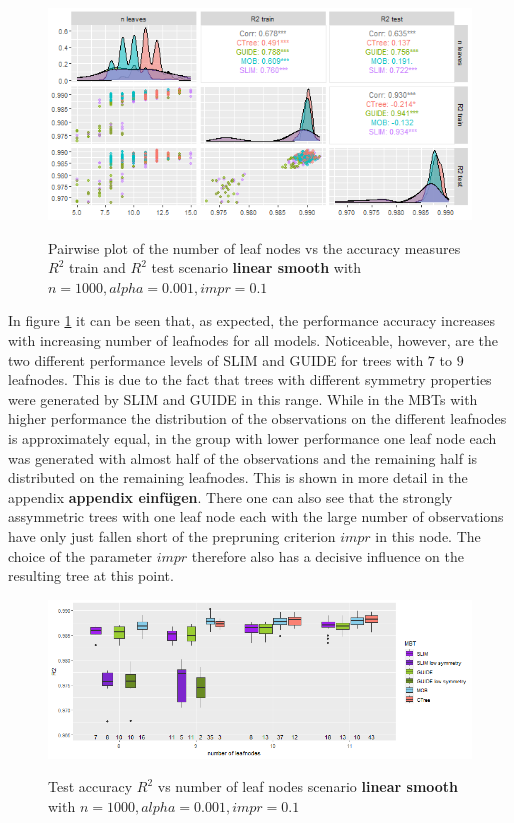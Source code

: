 \begin{figure}[!htb] 
\caption{Pairwise plot of the number of leaf nodes vs the accuracy measures $R^2$ train and $R^2$ test scenario \textbf{linear smooth} with $n=1000, alpha = 0.001, impr = 0.1$}
    \includegraphics[width=16cm]{Figures/simulations/batchtools/basic_scenarios/linear_smooth/ls_1000_standalone_r2_nleaves.png}
    \label{fig:ls_1000_standalone_r2_nleaves}
\end{figure} 


In figure \ref{fig:ls_1000_standalone_r2_nleaves} it can be seen that, as expected, the performance accuracy increases with increasing number of leafnodes for all models. Noticeable, however, are the two different performance levels of SLIM and GUIDE for trees with $7$ to $9$ leafnodes. This is due to the fact that trees with different symmetry properties were generated by SLIM and GUIDE in this range. While in the MBTs with higher performance the distribution of the observations on the different leafnodes is approximately equal, in the group with lower performance one leaf node each was generated with almost half of the observations and the remaining half is distributed on the remaining leafnodes. This is shown in more detail in the appendix \textbf{appendix einfügen}. There one can also see that the strongly assymmetric trees with one leaf node each with the large number of observations have only just fallen short of the prepruning criterion $impr$ in this node. The choice of the parameter $impr$ therefore also has a decisive influence on the resulting tree at this point.





\begin{figure}[!htb] 
\caption{Test accuracy $R^2$ vs number of leaf nodes scenario \textbf{linear smooth} with $n=1000, alpha = 0.001, impr = 0.1$}
    \includegraphics[width=16cm]{Figures/simulations/batchtools/basic_scenarios/linear_smooth/ls_1000_standalone_r2_test.png}
    \label{fig:ls_1000_standalone_r2_test}
\end{figure} 

